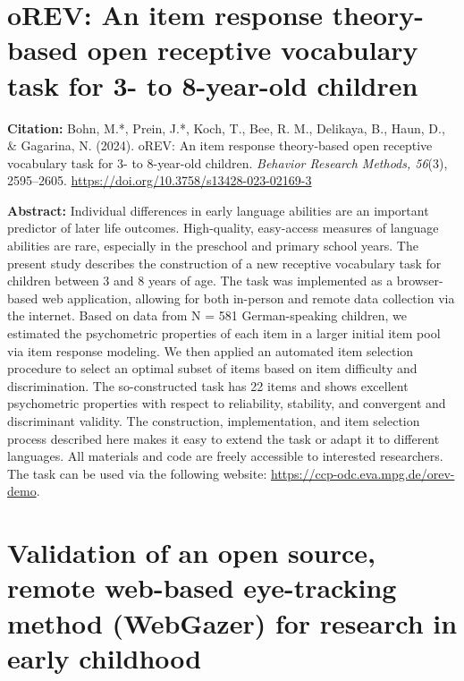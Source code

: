 \documentclass[
]{scrbook}
\begin{document}
\newpage

\section*{oREV: An item response theory-based open receptive vocabulary task for 3- to 8-year-old children}\label{orev}

\textbf{Citation:} Bohn, M.*, Prein, J.*, Koch, T., Bee, R. M., Delikaya, B., Haun, D., \& Gagarina, N. (2024). oREV: An item response theory-based open receptive vocabulary task for 3- to 8-year-old children. \emph{Behavior Research Methods, 56}(3), 2595--2605. \mbox{\url{https://doi.org/10.3758/s13428-023-02169-3}}

\textbf{Abstract:} Individual differences in early language abilities are an important predictor of later life outcomes. High-quality, easy-access measures of language abilities are rare, especially in the preschool and primary school years. The present study describes the construction of a new receptive vocabulary task for children between 3 and 8 years of age. The task was implemented as a browser-based web application, allowing for both in-person and remote data collection via the internet. Based on data from N = 581 German-speaking children, we estimated the psychometric properties of each item in a larger initial item pool via item response modeling. We then applied an automated item selection procedure to select an optimal subset of items based on item difficulty and discrimination. The so-constructed task has 22 items and shows excellent psychometric properties with respect to reliability, stability, and convergent and discriminant validity. The construction, implementation, and item selection process described here makes it easy to extend the task or adapt it to different languages. All materials and code are freely accessible to interested researchers. The task can be used via the following website: \mbox{\url{https://ccp-odc.eva.mpg.de/orev-demo}}.

\newpage

\section*{Validation of an open source, remote web-based eye-tracking method (WebGazer) for research in early childhood}\label{manywebcams}
\end{document}
